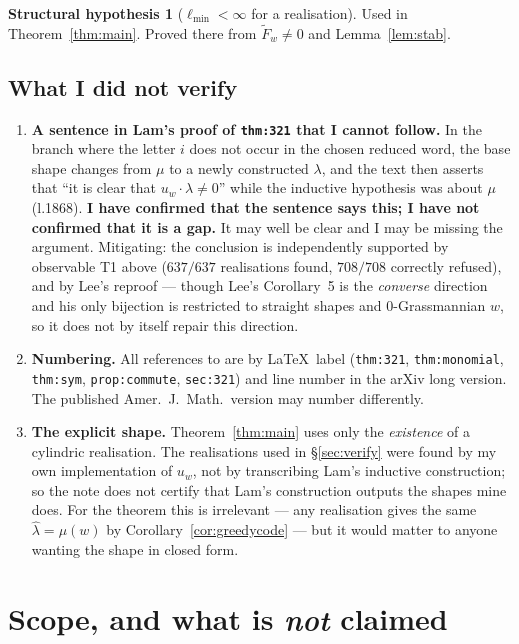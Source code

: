 \documentclass[11pt]{article}
\theoremstyle{plain}
\theoremstyle{definition}
\newtheorem{hyp}[thm]{Structural hypothesis}
\newcommand{\Fw}{\widetilde{F}_{w}}
\begin{document}
\begin{hyp}[$\ell_{\min}<\infty$ for a realisation]
Used in Theorem~\ref{thm:main}. Proved there from $\Fw\ne0$ and Lemma~\ref{lem:stab}.
\end{hyp}

\subsection{What I did not verify}

\begin{enumerate}
\item \textbf{A sentence in Lam's proof of \texttt{thm:321} that I cannot follow.} In the
branch where the letter $i$ does not occur in the chosen reduced word, the base shape changes
from $\mu$ to a newly constructed $\lambda$, and the text then asserts that ``it is clear that
$u_w\cdot\lambda\ne0$'' while the inductive hypothesis was about $\mu$ (l.1868). \textbf{I have
confirmed that the sentence says this; I have not confirmed that it is a gap.} It may well be
clear and I may be missing the argument. Mitigating: the conclusion is independently supported
by observable T1 above ($637/637$ realisations found, $708/708$ correctly refused), and by
Lee's reproof \cite{Lee2019} --- though Lee's Corollary~5 is the \emph{converse} direction and
his only bijection is restricted to straight shapes and $0$-Grassmannian $w$, so it does not by
itself repair this direction.
\item \textbf{Numbering.} All references to \cite{Lam2006} are by \LaTeX\ label
(\texttt{thm:321}, \texttt{thm:monomial}, \texttt{thm:sym}, \texttt{prop:commute},
\texttt{sec:321}) and line number in the arXiv long version. The published Amer.\ J.\ Math.\
version may number differently.
\item \textbf{The explicit shape.} Theorem~\ref{thm:main} uses only the \emph{existence} of a
cylindric realisation. The realisations used in \S\ref{sec:verify} were found by my own
implementation of $u_w$, not by transcribing Lam's inductive construction; so the note does not
certify that Lam's construction outputs the shapes mine does. For the theorem this is
irrelevant --- any realisation gives the same $\hat\lambda=\mu(w)$ by Corollary~\ref{cor:greedycode}
--- but it would matter to anyone wanting the shape in closed form.
\end{enumerate}

\section{Scope, and what is \emph{not} claimed}\label{sec:scope}
\end{document}
